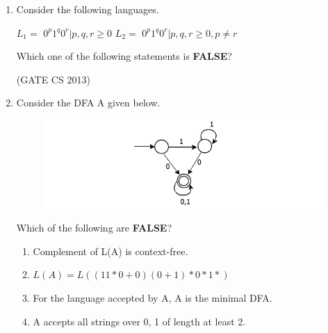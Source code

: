 \documentclass[a4paper, 11pt]{article}
\begin{document}
\begin{enumerate}
     \item Consider the following languages. 
     \begin{center}
         $L_1 =$ \lcbrak{} $0^p1^q0^r|p,q,r \geq 0 $\rcbrak{}
         $L_2 =$ \lcbrak{} $0^p1^q0^r|p,q,r \geq 0, p\neq r $\rcbrak{}
     \end{center}
     Which one of the following statements is \textbf{FALSE}? 
     \begin{enumerate}
     \end{enumerate}
     \hfill (GATE CS 2013)

     \item Consider the DFA A given below. 
     \begin{figure}[H]
         \centering
         \includegraphics[width=\columnwidth]{figs/q33.png}
         \label{fig:placeholder}
     \end{figure}
     Which of the following are \textbf{FALSE}? 
     \begin{enumerate}[label=\arabic*.]
         \item Complement of L(A) is context-free.
         \item $L(A) = L((11*0+0)(0 + 1)*0*1*) $
         \item For the language accepted by A, A is the minimal DFA.
         \item A accepts all strings over {0, 1} of length at least 2.
     \end{enumerate}
     \begin{enumerate}
     \end{enumerate}


\end{enumerate}
\end{document}
